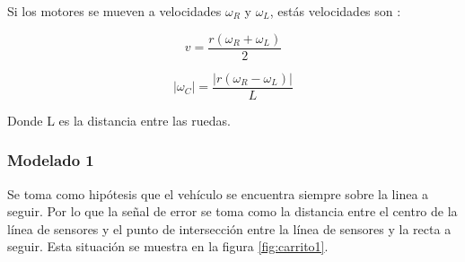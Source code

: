 \documentclass[10pt,conference,a4paper,onecolumn]{article}%
\begin{document}
%
%
%
%
%
%
%
%
 Si los motores se mueven a velocidades $\omega_R$ y $\omega_L$, estás velocidades son \cite{planning}:

\begin{equation}
v=\frac{r(\omega _R + \omega _L)}{2}
\end{equation}


\begin{equation}
\vert \omega_{C} \vert	=\frac{ \vert r(\omega _R - \omega _L) \vert }{L}
\end{equation}

Donde L es la distancia entre las ruedas. 

\subsubsection{Modelado 1}
Se toma como hipótesis que el vehículo se encuentra siempre sobre la linea a seguir.  Por lo que la señal de error se toma como la distancia entre el centro de la línea de sensores y el punto de intersección entre la línea de sensores y la recta a seguir. Esta situación se muestra en la figura \ref{fig:carrito1}.
\end{document}
